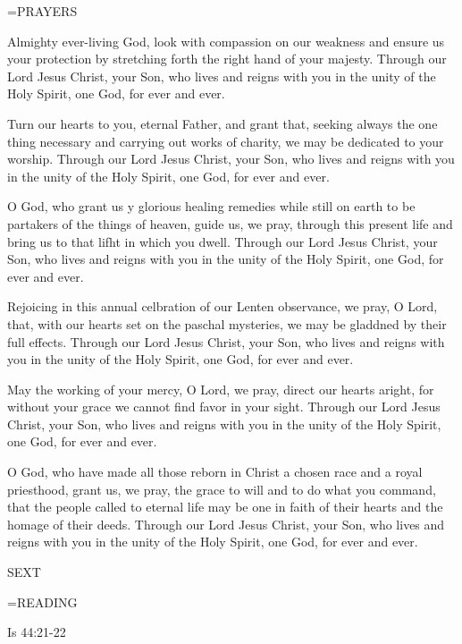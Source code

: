 \hangindent=\parindent \small PRAYERS
\begin{description}[labelindent=\parindent, noitemsep, leftmargin=*]
\item [Saturday after Ash Wednesday:] 	Almighty ever-living God, look with compassion on our weakness and ensure us your protection by stretching forth the right hand of your majesty. Through our Lord Jesus Christ, your Son, who lives and reigns with you in the unity of the Holy Spirit, one God, for ever and ever.
\item [Week 1:] 	Turn our hearts to you, eternal Father, and grant that, seeking always the one thing necessary and carrying out works of charity, we may be dedicated to your worship. Through our Lord Jesus Christ, your Son, who lives and reigns with you in the unity of the Holy Spirit, one God, for ever and ever.
\item [Week 2:] 	O God, who grant us y glorious healing remedies while still on earth to be partakers of the things of heaven, guide us, we pray, through this present life and bring us to that lifht in which you dwell. Through our Lord Jesus Christ, your Son, who lives and reigns with you in the unity of the Holy Spirit, one God, for ever and ever.
\item [Week 3:] 	Rejoicing in this annual celbration of our Lenten observance, we pray, O Lord, that, with our hearts set on the paschal mysteries, we may be gladdned by their full effects. Through our Lord Jesus Christ, your Son, who lives and reigns with you in the unity of the Holy Spirit, one God, for ever and ever.
\item [Week 4:] 	May the working of your mercy, O Lord, we pray, direct our hearts aright, for without your grace we cannot find favor in your sight. Through our Lord Jesus Christ, your Son, who lives and reigns with you in the unity of the Holy Spirit, one God, for ever and ever.
\item [Week 5:] 	O God, who have made all those reborn in Christ a chosen race and a royal priesthood, grant us, we pray, the grace to will and to do what you command, that the people called to eternal life may be one in faith of their hearts and the homage of their deeds. Through our Lord Jesus Christ, your Son, who lives and reigns with you in the unity of the Holy Spirit, one God, for ever and ever.
\end{description}

\begin{flushleft}\normalsize SEXT\\\end{flushleft}
\hangindent=\parindent \small READING
\begin{description}[labelindent=\parindent, leftmargin=*]
\item [Saturday after Ash Wednesday \& Weeks 1-4:]     Is 44:21-22 \textbf{    }
\end{description}


